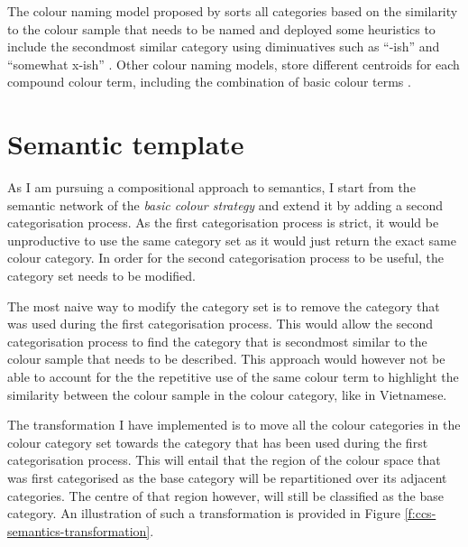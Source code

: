 The colour naming model proposed by
\citeauthor{lammens94computational} sorts all categories based on the
similarity to the colour sample that needs to be named and deployed
some heuristics to include the secondmost similar category using
diminuatives such as ``-ish'' and ``somewhat x-ish''
\citep{lammens94computational}. Other colour naming models, store
different centroids for each compound colour term, including the
combination of basic colour terms \citep{mojsilovic05computational}.

\section{Semantic template}
\label{s:ccs-semantic-template}

As I am pursuing a compositional approach to semantics, I start from
the semantic network of the \emph{basic colour strategy} and extend it by
adding a second categorisation process. As the first categorisation
process is strict, it would be unproductive to use the same category
set as it would just return the exact same colour category. In order
for the second categorisation process to be useful, the category set
needs to be modified.

The most naive way to modify the category set is to remove the
category that was used during the first categorisation process. This
would allow the second categorisation process to find the category
that is secondmost similar to the colour sample that needs to be
described. This approach would however not be able to account for the
the repetitive use of the same colour term to highlight the similarity
between the colour sample in the colour category, like in Vietnamese.

The transformation I have implemented is to move all the colour
categories in the colour category set towards the category that has
been used during the first categorisation process. This will entail
that the region of the colour space that was first categorised as the
base category will be repartitioned over its adjacent categories. The
centre of that region however, will still be classified as the base
category. An illustration of such a transformation is provided in
Figure \ref{f:ccs-semantics-transformation}.

